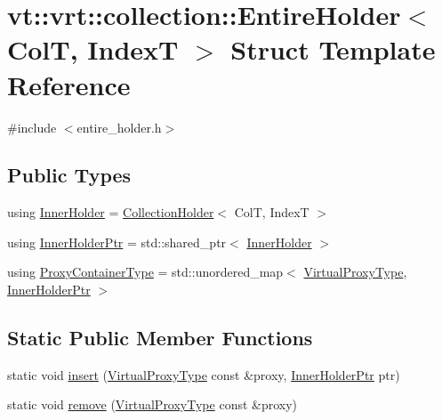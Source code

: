 \hypertarget{structvt_1_1vrt_1_1collection_1_1_entire_holder}{}\section{vt\+:\+:vrt\+:\+:collection\+:\+:Entire\+Holder$<$ ColT, IndexT $>$ Struct Template Reference}
\label{structvt_1_1vrt_1_1collection_1_1_entire_holder}


{\ttfamily \#include $<$entire\+\_\+holder.\+h$>$}

\subsection*{Public Types}
\begin{DoxyCompactItemize}
\item 
using \hyperlink{structvt_1_1vrt_1_1collection_1_1_entire_holder_a79a0b61eec1c65f662f3dfbf9adae52e}{Inner\+Holder} = \hyperlink{structvt_1_1vrt_1_1collection_1_1_collection_holder}{Collection\+Holder}$<$ ColT, IndexT $>$
\item 
using \hyperlink{structvt_1_1vrt_1_1collection_1_1_entire_holder_a33e5814cfc24ea357365fa5e2296b08f}{Inner\+Holder\+Ptr} = std\+::shared\+\_\+ptr$<$ \hyperlink{structvt_1_1vrt_1_1collection_1_1_entire_holder_a79a0b61eec1c65f662f3dfbf9adae52e}{Inner\+Holder} $>$
\item 
using \hyperlink{structvt_1_1vrt_1_1collection_1_1_entire_holder_a40524236d95912099482d033b337db81}{Proxy\+Container\+Type} = std\+::unordered\+\_\+map$<$ \hyperlink{namespacevt_a1b417dd5d684f045bb58a0ede70045ac}{Virtual\+Proxy\+Type}, \hyperlink{structvt_1_1vrt_1_1collection_1_1_entire_holder_a33e5814cfc24ea357365fa5e2296b08f}{Inner\+Holder\+Ptr} $>$
\end{DoxyCompactItemize}
\subsection*{Static Public Member Functions}
\begin{DoxyCompactItemize}
\item 
static void \hyperlink{structvt_1_1vrt_1_1collection_1_1_entire_holder_a2b659e216ee3aa05de503f2fa89cc825}{insert} (\hyperlink{namespacevt_a1b417dd5d684f045bb58a0ede70045ac}{Virtual\+Proxy\+Type} const \&proxy, \hyperlink{structvt_1_1vrt_1_1collection_1_1_entire_holder_a33e5814cfc24ea357365fa5e2296b08f}{Inner\+Holder\+Ptr} ptr)
\item 
static void \hyperlink{structvt_1_1vrt_1_1collection_1_1_entire_holder_a4f73d44389663ab464cb7f48e2b27fb2}{remove} (\hyperlink{namespacevt_a1b417dd5d684f045bb58a0ede70045ac}{Virtual\+Proxy\+Type} const \&proxy)
\end{DoxyCompactItemize}
